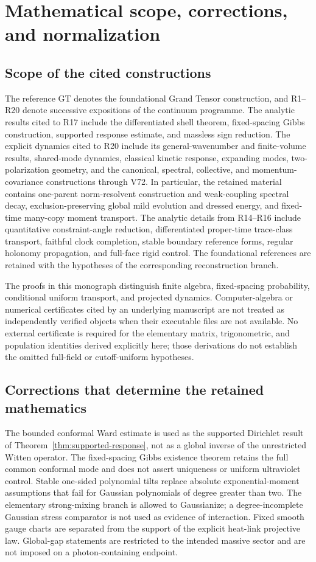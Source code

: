 \documentclass[11pt,a4paper,oneside]{book}
\theoremstyle{plain}
\theoremstyle{definition}
\theoremstyle{remark}
\begin{document}
\chapter{Mathematical scope, corrections, and normalization}
\label{app:sources}
\section{Scope of the cited constructions}
The reference GT denotes the foundational Grand Tensor construction, and
R1--R20 denote successive expositions of the continuum programme.  The
analytic results cited to R17 include the differentiated shell theorem,
fixed-spacing Gibbs construction, supported response estimate, and
massless sign reduction.  The explicit dynamics cited to R20 include its
general-wavenumber and finite-volume results, shared-mode dynamics,
classical kinetic response, expanding modes, two-polarization geometry,
and the canonical, spectral, collective, and momentum-covariance
constructions through V72.  In particular, the retained material
contains one-parent norm-resolvent construction and weak-coupling
spectral decay, exclusion-preserving global mild evolution and dressed
energy, and fixed-time many-copy moment transport.  The analytic details
from R14--R16 include quantitative constraint-angle reduction,
differentiated proper-time trace-class transport, faithful clock
completion, stable boundary reference forms, regular holonomy
propagation, and full-face rigid control.  The foundational references are
retained with the hypotheses of the corresponding reconstruction branch.

The proofs in this monograph distinguish finite algebra, fixed-spacing
probability, conditional uniform transport, and projected dynamics.
Computer-algebra or numerical certificates cited by an underlying
manuscript are not treated as independently verified objects when their
executable files are not available.  No external certificate is required
for the elementary matrix, trigonometric, and population identities
derived explicitly here; those derivations do not establish the omitted
full-field or cutoff-uniform hypotheses.

\section{Corrections that determine the retained mathematics}
The bounded conformal Ward estimate is used as the supported Dirichlet result of Theorem~\ref{thm:supported-response}, not as a global inverse of the unrestricted Witten operator. The fixed-spacing Gibbs existence theorem retains the full common conformal mode and does not assert uniqueness or uniform ultraviolet control. Stable one-sided polynomial tilts replace absolute exponential-moment assumptions that fail for Gaussian polynomials of degree greater than two. The elementary strong-mixing branch is allowed to Gaussianize; a degree-incomplete Gaussian stress comparator is not used as evidence of interaction. Fixed smooth gauge charts are separated from the support of the explicit heat-link projective law. Global-gap statements are restricted to the intended massive sector and are not imposed on a photon-containing endpoint.
\end{document}
